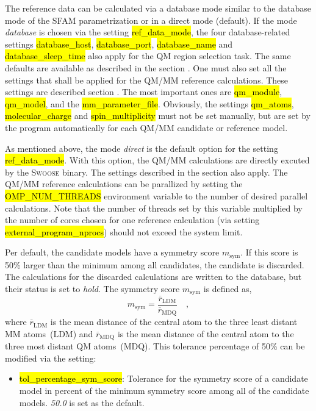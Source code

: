 \documentclass[]{tufte-book}
\begin{document}
{{The reference data can be calculated via a database mode similar to the database mode of the SFAM parametrization or in a direct mode (default). If the mode \textit{database} is chosen via the setting \hl{ref\_data\_mode}, the four database-related settings
\hl{database\_host}, 
\hl{database\_port}, 
\hl{database\_name} and
\hl{database\_sleep\_time}
also apply for the QM region selection task. The same defaults are available as described in the section . One must also set all the settings that shall be applied for the QM/MM reference calculations. These settings are described section . The most important ones are \hl{qm\_module}, \hl{qm\_model}, and the \hl{mm\_parameter\_file}. Obviously, the settings \hl{qm\_atoms}, \hl{molecular\_charge} and \hl{spin\_multiplicity} must not be set manually, but are set by the program automatically for each QM/MM candidate or reference model.

As mentioned above, the mode \textit{direct} is the default option for the setting \hl{ref\_data\_mode}. With this option, the QM/MM calculations are directly excuted by the \textsc{Swoose} binary. The settings described in the section  also apply. The QM/MM reference calculations can be parallized by setting the \hl{OMP\_NUM\_THREADS} environment variable to the number of desired parallel calculations. Note that the number of threads set by this variable multiplied by the number of cores chosen for one reference calculation (via setting \hl{external\_program\_nprocs}) should not exceed the system limit.

Per default, the candidate models have a symmetry score $m_\text{sym}$. If this score is 50\% larger than the minimum among all candidates, the candidate is discarded. The calculations for the discarded calculations are written to the database, but their status is set to \textit{hold}. The symmetry score $m_\text{sym}$ is defined as,
\begin{equation}
 m_\text{sym} = \frac{\overline{r}_\text{LDM}}{\overline{r}_\text{MDQ}} \quad , \label{eq:symm_score}
\end{equation}
where $\overline{r}_\text{LDM}$ is the mean distance of the central atom to the three least distant MM atoms~(LDM) and $\overline{r}_\text{MDQ}$
is the mean distance of the central atom to the three most distant QM atoms~(MDQ). This tolerance percentage of 50\% can be modified via the setting:

\begin{itemize}
\item \hl{tol\_percentage\_sym\_score}: Tolerance for the symmetry score of a candidate model in percent of the minimum symmetry score among all of the candidate models. \textit{50.0} is set as the default.
\end{itemize}

}}
\end{document}
